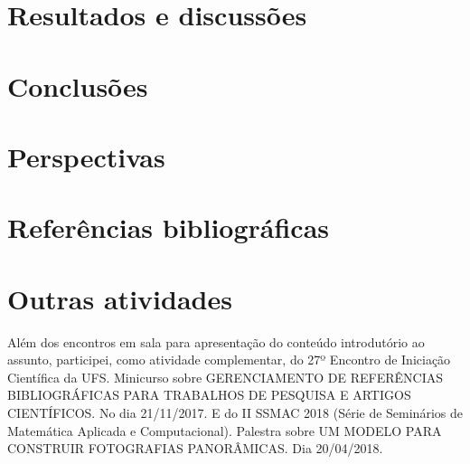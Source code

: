 \documentclass[12pt, a4paper]{article}
\begin{document}
\newpage

\section{Resultados e discussões }
\section{Conclusões}
\section{Perspectivas}

\newpage

\section{Referências bibliográficas}

	
\newpage

\section{Outras atividades}
Além dos encontros em sala para apresentação do conteúdo introdutório ao assunto,
participei, como atividade complementar, do 27º Encontro de Iniciação Científica da UFS.
Minicurso sobre GERENCIAMENTO DE REFERÊNCIAS BIBLIOGRÁFICAS PARA
TRABALHOS DE PESQUISA E ARTIGOS CIENTÍFICOS. No dia 21/11/2017. E do II SSMAC 2018 (Série de Seminários de Matemática Aplicada e Computacional). Palestra sobre UM MODELO PARA CONSTRUIR FOTOGRAFIAS PANORÂMICAS. Dia 20/04/2018.\
\end{document}
